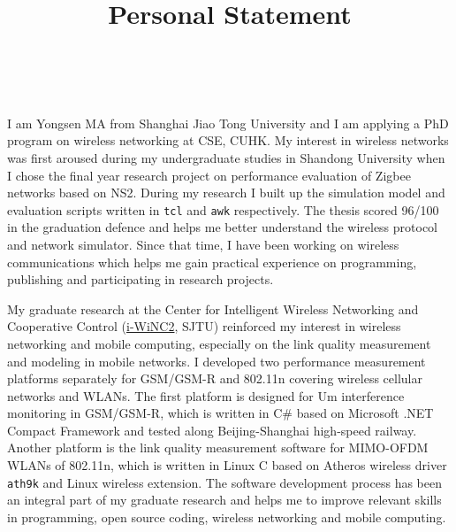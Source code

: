 \documentclass[conference,onecolumn]{IEEEtran}
\title{Personal Statement}
\author{\IEEEauthorblockN{Yongsen MA} \\
}
\begin{document}
\maketitle%

I am Yongsen MA from Shanghai Jiao Tong University and I am applying a PhD program on wireless networking at CSE, CUHK. My interest in wireless networks was first aroused during my undergraduate studies in Shandong University when I chose the final year research project on performance evaluation of Zigbee networks based on NS2. During my research I built up the simulation model and evaluation scripts written in \verb"tcl" and \verb"awk" respectively. The thesis scored 96/100 in the graduation defence and helps me better understand the wireless protocol and network simulator. Since that time, I have been working on wireless communications which helps me gain practical experience on programming, publishing and participating in research projects.

My graduate research at the Center for Intelligent Wireless Networking and Cooperative Control (\href{http://wicnc.sjtu.edu.cn}{i-WiNC2}, SJTU) reinforced my interest in wireless networking and mobile computing, especially on the link quality measurement and modeling in mobile networks. I developed two performance measurement platforms separately for GSM/GSM-R and 802.11n covering wireless cellular networks and WLANs. The first platform is designed for Um interference monitoring in GSM/GSM-R, which is written in C\# based on Microsoft .NET Compact Framework and tested along Beijing-Shanghai high-speed railway. Another platform is the link quality measurement software for MIMO-OFDM WLANs of 802.11n, which is written in Linux C based on Atheros wireless driver \texttt{ath9k} and Linux wireless extension. The software development process has been an integral part of my graduate research and helps me to improve relevant skills in programming, open source coding, wireless networking and mobile computing.
\end{document}
